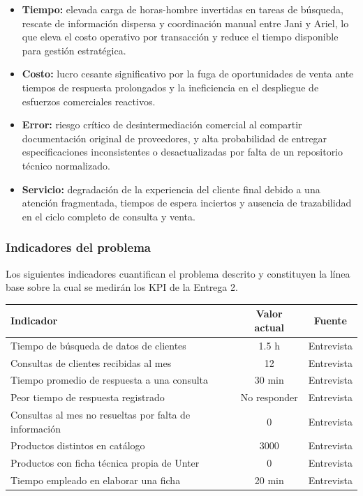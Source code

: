 \documentclass{article}
\begin{document}
\begin{itemize}
\item \textbf{Tiempo:} elevada carga de horas-hombre invertidas en tareas de búsqueda, rescate de información dispersa y coordinación manual entre Jani y Ariel, lo que eleva el costo operativo por transacción y reduce el tiempo disponible para gestión estratégica.
\item \textbf{Costo:} lucro cesante significativo por la fuga de oportunidades de venta ante tiempos de respuesta prolongados y la ineficiencia en el despliegue de esfuerzos comerciales reactivos.
\item \textbf{Error:} riesgo crítico de desintermediación comercial al compartir documentación original de proveedores, y alta probabilidad de entregar especificaciones inconsistentes o desactualizadas por falta de un repositorio técnico normalizado.
\item \textbf{Servicio:} degradación de la experiencia del cliente final debido a una atención fragmentada, tiempos de espera inciertos y ausencia de trazabilidad en el ciclo completo de consulta y venta.
\end{itemize}

\subsubsection*{Indicadores del problema}

Los siguientes indicadores cuantifican el problema descrito y constituyen la línea base sobre la cual se medirán los KPI de la Entrega 2.

\begin{table}[H]
\centering
\begin{tabularx}{\textwidth}{Lcc}
\toprule
\textbf{Indicador} & \textbf{Valor actual} & \textbf{Fuente} \\
\midrule
Tiempo de búsqueda de datos de clientes & 1.5 h & Entrevista \\
Consultas de clientes recibidas al mes & 12 & Entrevista \\
Tiempo promedio de respuesta a una consulta & 30 min & Entrevista \\
Peor tiempo de respuesta registrado & No responder & Entrevista \\
Consultas al mes no resueltas por falta de información & 0 & Entrevista \\
Productos distintos en catálogo & 3000 & Entrevista \\
Productos con ficha técnica propia de Unter & 0 & Entrevista \\
Tiempo empleado en elaborar una ficha & 20 min & Entrevista \\
\bottomrule
\end{tabularx}
\end{table}
\end{document}
